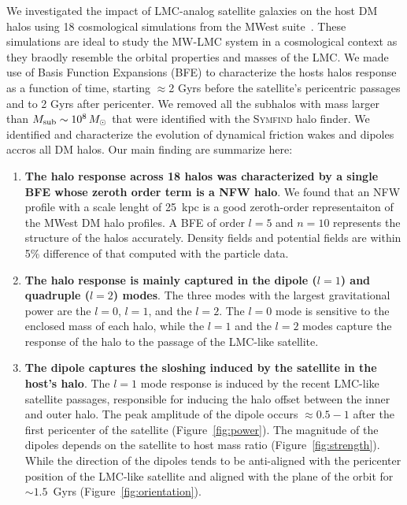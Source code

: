 \documentclass[twocolumn, linenumbers]{openjournal}
\begin{document}
We investigated the impact of LMC-analog satellite galaxies on the host DM halos 
using 18 cosmological simulations from the MWest suite~\cite{buch2024milky}. These simulations
are ideal to study the MW-LMC system in a cosmological context as they 
braodly resemble the orbital properties and masses of the LMC. We made use of Basis 
Function Expansions (BFE) to characterize the hosts halos response as a function of time, 
starting $\approx$2 Gyrs before the satellite's pericentric passages and to 2 Gyrs after pericenter. 
We removed all the subhalos with mass larger than $M_{\rm sub} \sim 10^8\, M_\odot$ 
that were identified with the \textsc{Symfind} halo finder. We identified and characterize 
the evolution of dynamical friction wakes and dipoles accros all DM halos. Our main finding are summarize here:  

\begin{enumerate} 
    \item \textbf{The halo response across 18 halos was characterized by a single BFE whose zeroth order 
    term is a NFW halo}. We found that an NFW profile with a scale lenght of 25~kpc is a good zeroth-order
    representaiton of the MWest DM halo profiles. A BFE of order $l=5$ and $n=10$ represents the 
    structure of the halos accurately. Density fields and potential fields are within
     5\% difference of that computed with the particle data.

    \item \textbf{The halo response is mainly captured in the dipole ($l=1$) and quadruple ($l=2$) modes}. 
    The three modes with the largest gravitational power are the $l=0$, $l=1$, and the $l=2$. 
    The $l=0$ mode is sensitive to the enclosed mass of each halo, while the $l=1$ and the $l=2$
    modes capture the response of the halo to the passage of the LMC-like satellite.  
    
    \item \textbf{The dipole captures the sloshing induced by the satellite in the host's halo}.
    The $l=1$ mode response is induced by the recent LMC-like satellite passages, 
    responsible for inducing the halo offset between the inner and outer halo. The peak amplitude of the dipole
    occurs $\approx 0.5-1$ after the first pericenter of the satellite (Figure~\ref{fig:power}).
    The magnitude of the dipoles depends on the satellite to host mass ratio
    (Figure~\ref{fig:strength}). While the direction of the dipoles tends to be anti-aligned with the pericenter position of the 
    LMC-like satellite and aligned with the plane of the orbit for $\sim 1.5$~Gyrs (Figure~\ref{fig:orientation}). 
   

\end{enumerate}
\end{document}
